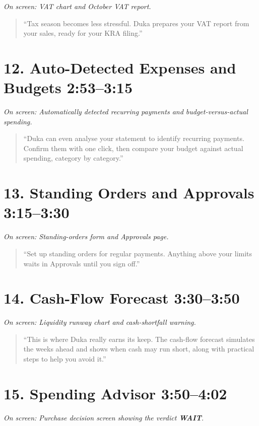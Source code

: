 \documentclass[11pt,a4paper]{article}
\newcommand{\timestamp}[1]{%
  \textcolor{dukablue}{\textbf{#1}}%
}
\newcommand{\screen}[1]{%
  \par\textit{\textcolor{mutedgray}{On screen: #1}}\par
}
\newcommand{\narration}[1]{%
  \begin{quote}
    \smallskip
    ``#1''
    \smallskip
  \end{quote}
}
\begin{document}
\screen{VAT chart and October VAT report.}

\narration{Tax season becomes less stressful. Duka prepares
your VAT report from your sales, ready for your KRA filing.}

\section*{12. Auto-Detected Expenses and Budgets \hfill
\small \timestamp{2:53--3:15}}

\screen{Automatically detected recurring payments and
budget-versus-actual spending.}

\narration{Duka can even analyse your statement to identify
recurring payments. Confirm them with one click, then compare
your budget against actual spending, category by category.}

\section*{13. Standing Orders and Approvals \hfill
\small \timestamp{3:15--3:30}}

\screen{Standing-orders form and Approvals page.}

\narration{Set up standing orders for regular payments.
Anything above your limits waits in Approvals until you
sign off.}

\section*{14. Cash-Flow Forecast \hfill
\small \timestamp{3:30--3:50}}

\screen{Liquidity runway chart and cash-shortfall warning.}

\narration{This is where Duka really earns its keep.
The cash-flow forecast simulates the weeks ahead and shows
when cash may run short, along with practical steps to
help you avoid it.}

\section*{15. Spending Advisor \hfill
\small \timestamp{3:50--4:02}}

\screen{Purchase decision screen showing the verdict
\textbf{WAIT}.}
\end{document}
